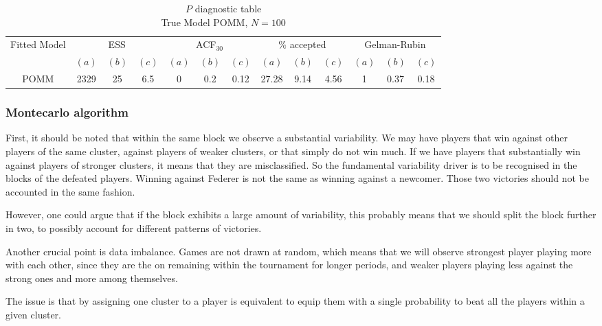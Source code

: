 \documentclass[11pt]{amsart}
\begin{document}
\begin{table}[htbp]
\centering
\caption*{
{\large $P$ diagnostic table} \\ 
{\small True Model POMM, $N=100$}
} 
\begin{tabular}{ccccccccccccc}
\toprule
\multirow{2}{*}{Fitted Model} & \multicolumn{3}{c}{ESS} & \multicolumn{3}{c}{
ACF$_{30}$} & \multicolumn{3}{c}{$\%$ accepted} & \multicolumn{3}{c}{Gelman-Rubin}\\
\cmidrule(lr){2-4} \cmidrule(lr){5-7} \cmidrule(lr){8-10} \cmidrule(lr){11-13} 
& $(a)$ & $(b)$ & $(c)$ & $(a)$ & $(b)$ & $(c)$ & $(a)$ & $(b)$ & $(c)$ & $(a)$ & $(b)$ & $(c)$ \\
\midrule
POMM &2329 & 25 & 6.5 & 0 & 0.2 & 0.12 & 27.28 & 9.14 & 4.56 & 1 & 0.37 & 0.18  \\
\bottomrule
\end{tabular}
\label{table:simulations_from_simple}
\end{table}

\clearpage


\subsubsection{Montecarlo algorithm}




First, it should be noted that within the same block we observe a substantial variability. We may have players that win against other players of the same cluster, against players of weaker clusters, or that simply do not win much. If we have players that substantially win against players of stronger clusters, it means that they are misclassified. So the fundamental variability driver is to be recognised in the blocks of the defeated players. Winning against Federer is not the same as winning against a newcomer. Those two victories should not be accounted in the same fashion.

However, one could argue that if the block exhibits a large amount of variability, this probably means that we should split the block further in two, to possibly account for different patterns of victories.

Another crucial point is data imbalance. Games are not drawn at random, which means that we will observe strongest player playing more with each other, since they are the on remaining within the tournament for longer periods, and weaker players playing less against the strong ones and more among themselves.

The issue is that by assigning one cluster to a player is equivalent to equip them with a single probability to beat all the players within a given cluster.
\end{document}
